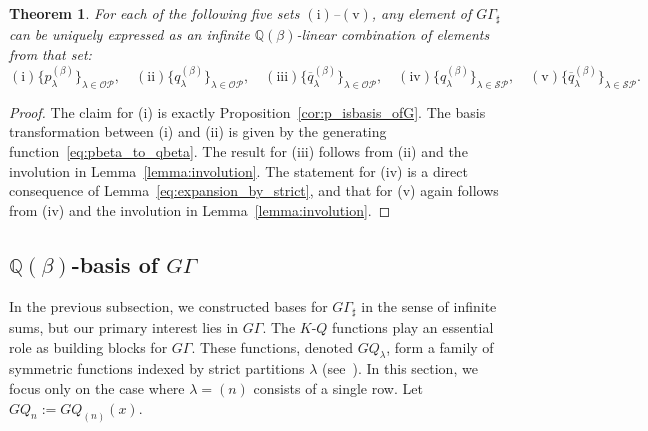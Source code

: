 \documentclass[dvipdfmx]{amsart}
\newtheorem{thm}{Theorem}[section]
\theoremstyle{definition}
\theoremstyle{remark}
\begin{document}
\begin{thm}\label{prop:expansion_of_GGamma}
For each of the following five sets \( \mathrm{(i)} \)–\( \mathrm{(v)} \), any element of \( G\Gamma_\sharp \) can be uniquely expressed as an infinite \( \mathbb{Q}(\beta) \)-linear combination of elements from that set:
\[
\mathrm{(i)} \{p_\lambda^{(\beta)}\}_{\lambda \in \mathcal{OP}} ,\quad
\mathrm{(ii)} \{q_\lambda^{(\beta)}\}_{\lambda \in \mathcal{OP}},\quad
\mathrm{(iii)} \{\overline{q}_\lambda^{(\beta)}\}_{\lambda \in \mathcal{OP}},\quad
\mathrm{(iv)} \{q_\lambda^{(\beta)}\}_{\lambda \in \mathcal{SP}},\quad
\mathrm{(v)} \{\overline{q}_\lambda^{(\beta)}\}_{\lambda \in \mathcal{SP}}.
\]
%
\end{thm}

\begin{proof}
The claim for (i) is exactly Proposition~\ref{cor:p_isbasis_ofG}.  
The basis transformation between (i) and (ii) is given by the generating function~\eqref{eq:pbeta_to_qbeta}.  
The result for (iii) follows from (ii) and the involution in Lemma~\ref{lemma:involution}.  
The statement for (iv) is a direct consequence of Lemma~\ref{eq:expansion_by_strict},  
and that for (v) again follows from (iv) and the involution in Lemma~\ref{lemma:involution}.
\end{proof}

\subsection{\( \mathbb{Q}(\beta) \)-basis of \( G\Gamma \)}

In the previous subsection, we constructed bases for \( G\Gamma_\sharp \) in the sense of infinite sums, but our primary interest lies in \( G\Gamma \). 
The \( K \)-\( Q \) functions play an essential role as building blocks for \( G\Gamma \). These functions, denoted \( GQ_\lambda \), form a family of symmetric functions indexed by strict partitions \( \lambda \) (see~\cite{IKEDA201322}). In this section, we focus only on the case where \( \lambda = (n) \) consists of a single row. 
Let \( GQ_n := GQ_{(n)}(x) \).
\end{document}
